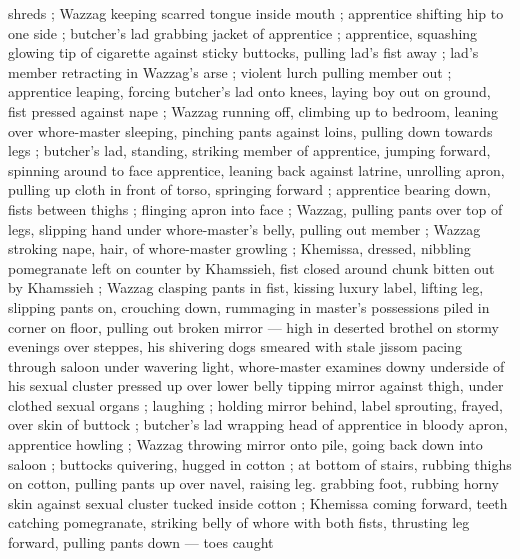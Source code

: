 {shreds{\thd}} ; Wazzag keeping scarred tongue inside mouth ; apprentice shifting hip to one side  ; butcher's lad grabbing jacket of apprentice ; apprentice, squashing glowing tip of cigarette against sticky buttocks, pulling lad's fist away ; lad's member retracting in Wazzag's arse ; violent lurch pulling member out ; apprentice leaping, forcing butcher's lad onto knees, laying boy out on ground, fist pressed against nape ; Wazzag running off, climbing up to bedroom, leaning over whore-master sleeping, pinching pants against loins, pulling down towards legs ; butcher's lad, standing, striking member of apprentice, jumping forward, spinning around to face apprentice, leaning back against latrine, unrolling apron, pulling up cloth in front of torso, springing forward ; apprentice bearing down, fists between thighs ; flinging apron into face ; Wazzag, pulling pants over top of legs, slipping hand under whore-master's belly, pulling out member ; Wazzag stroking nape, hair, of whore-master growling ; Khemissa, dressed, nibbling pomegranate left on counter by Khamssieh, fist closed around chunk bitten out by Khamssieh ; Wazzag clasping pants in fist, kissing luxury label, lifting leg, slipping pants on, crouching down, rummaging in master's possessions piled in corner on floor, pulling out broken mirror --- high in deserted brothel on stormy evenings over steppes, his shivering dogs smeared with stale jissom pacing through saloon under wavering light, whore-master examines downy underside of his sexual cluster pressed up over lower belly {\dashsemi} tipping mirror against thigh, under clothed sexual organs ; laughing ; holding mirror behind, label sprouting, frayed, over skin of buttock ; butcher's lad wrapping head of apprentice in bloody apron, apprentice howling ; Wazzag throwing mirror onto pile, going back down into saloon ; buttocks quivering, hugged in cotton ; at bottom of stairs, rubbing thighs on cotton, pulling pants up over navel, raising leg. grabbing foot, rubbing horny skin against sexual cluster tucked inside cotton ; Khemissa coming forward, teeth catching pomegranate, striking belly of whore with both fists, thrusting leg forward, pulling pants down --- toes caught 
